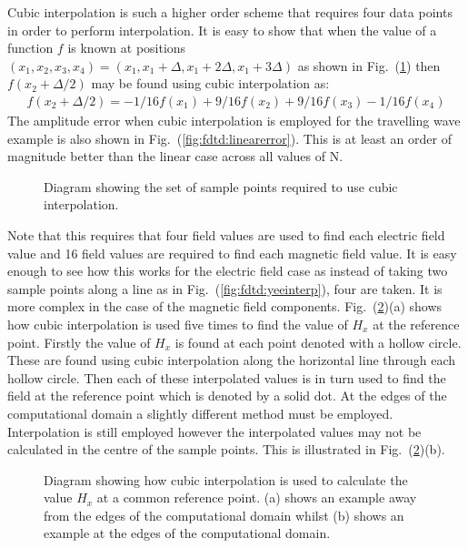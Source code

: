 \documentclass[a4paper, 12pt]{article}
\newcommand{\rfig}[1]{Fig.\ (\ref{#1})}
\begin{document}
	Cubic interpolation is such a
	higher order scheme that requires four data points in order to perform
	interpolation. It is easy to show that when the value of a function
	$f$ is known at positions $(x_1,x_2,x_3,x_4) =
	(x_1,x_1+\Delta,x_1+2\Delta,x_1+3\Delta)$ as shown in
	\rfig{fig:fdtd:cubicinterp} then $f(x_2+\Delta/2)$ may be found using
	cubic interpolation as:
	\begin{eqnarray}
		\label{eq:fdtd:cubicinterp}
		f(x_2+\Delta/2) = -1/16f(x_1)+9/16f(x_2)+9/16f(x_3)-1/16f(x_4)
	\end{eqnarray}
	The amplitude error when cubic interpolation is employed for the
	travelling wave example is also shown in
	\rfig{fig:fdtd:linearerror}. This is at least an order of magnitude
	better than the linear case across all values of N.
	\begin{figure}[!h]
		\centering
		\caption{Diagram showing the set of sample points required to use
			cubic interpolation.}
		\label{fig:fdtd:cubicinterp}
	\end{figure}
	
	Note that this requires that four field values are used to find each
	electric field value and 16 field values are required to find each
	magnetic field value. It is easy enough to see how this works for the
	electric field case as instead of taking two sample points along a
	line as in \rfig{fig:fdtd:yeeinterp}, four are taken. It is more
	complex in the case of the magnetic field
	components. \rfig{fig:fdtd:cubichx}(a) shows how cubic interpolation is
	used five times to find the value of $H_x$ at the reference
	point. Firstly the value of $H_x$ is found at each point denoted with
	a hollow circle. These are found using cubic interpolation along the
	horizontal line through each hollow circle. Then each of these
	interpolated values is in turn used to find the field at the
	reference point which is denoted by a solid dot. At the edges of the
	computational domain a slightly different method must be
	employed. Interpolation is still employed however the interpolated
	values may not be calculated in the centre of the sample points. This
	is illustrated in \rfig{fig:fdtd:cubichx}(b).
	
	\begin{figure}[!h]
		\centering
		\caption{Diagram showing how cubic interpolation is used to
			calculate the value $H_x$ at a common reference point. (a) shows an
			example away from the edges of the computational domain whilst (b)
			shows an example at the edges of the computational domain.}
		\label{fig:fdtd:cubichx}
	\end{figure}
\end{document}
